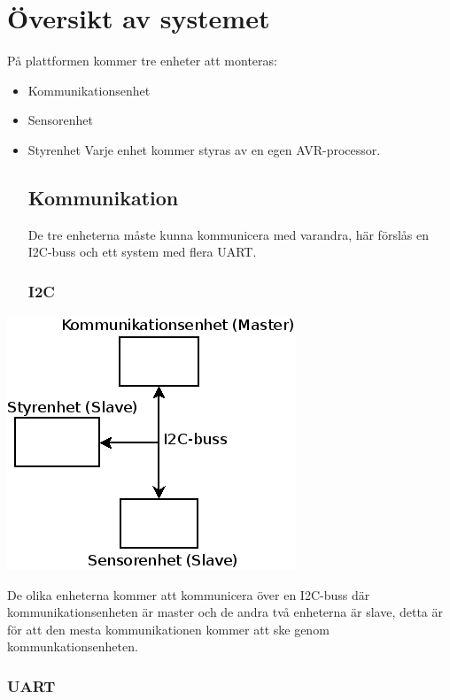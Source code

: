 \documentclass[a4paper,12pt]{article}
\begin{document}
\section{Översikt av systemet}
På plattformen kommer tre enheter att monteras:
\begin{itemize}
        \item Kommunikationsenhet
        \item Sensorenhet
        \item Styrenhet
Varje enhet kommer styras av en egen AVR-processor.
\subsection{Kommunikation}
De tre enheterna måste kunna kommunicera med varandra, här förslås en I2C-buss och ett system med flera UART.

\subsubsection{I2C}

\end{itemize}
\begin{center}
\includegraphics[scale=0.7]{delsystem_i2c.png}
\end{center}
De olika enheterna kommer att kommunicera över en I2C-buss där kommunikationsenheten är master och de andra två enheterna är slave,
detta är för att den mesta kommunikationen kommer att ske genom kommunkationsenheten.

\subsubsection{UART}
\end{document}
